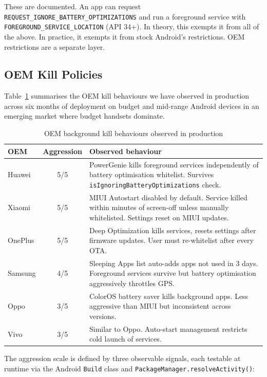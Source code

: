 \documentclass[10pt,journal,compsoc]{IEEEtran}
\begin{document}
These are documented. An app can request
\texttt{REQUEST\_IGNORE\_BATTERY\_OPTIMIZATIONS} and run a foreground
service with \texttt{FOREGROUND\_SERVICE\_LOCATION} (API 34+).  In
theory, this exempts it from all of the above. In practice, it exempts
it from stock Android's restrictions. OEM restrictions are a separate
layer.

\subsection{OEM Kill Policies}

Table~\ref{tab:oem} summarises the OEM kill behaviours we have observed
in production across six months of deployment on budget and mid-range
Android devices in an emerging market where budget handsets dominate.

\begin{table}[h]
\caption{OEM background kill behaviours observed in production}
\label{tab:oem}
\small
\begin{tabular}{@{}p{1.6cm}cp{4.8cm}@{}}
\toprule
OEM & Aggression & Observed behaviour \\
\midrule
Huawei    & 5/5 & PowerGenie kills foreground services independently of battery optimisation whitelist. Survives \texttt{isIgnoring\-BatteryOptimizations} check. \\
Xiaomi    & 5/5 & MIUI Autostart disabled by default. Service killed within minutes of screen-off unless manually whitelisted. Settings reset on MIUI updates. \\
OnePlus   & 5/5 & Deep Optimization kills services, resets settings after firmware updates. User must re-whitelist after every OTA. \\
Samsung   & 4/5 & Sleeping Apps list auto-adds apps not used in 3 days. Foreground services survive but battery optimisation aggressively throttles GPS. \\
Oppo      & 3/5 & ColorOS battery saver kills background apps. Less aggressive than MIUI but inconsistent across versions. \\
Vivo      & 3/5 & Similar to Oppo. Auto-start management restricts cold launch of services. \\
\bottomrule
\end{tabular}
\end{table}

The aggression scale is defined by three observable signals, each
testable at runtime via the Android \texttt{Build} class and
\texttt{PackageManager.resolveActivity()}:
\end{document}

